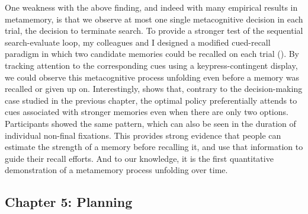 \documentclass[11pt,a4paperpaper,]{article}
\begin{document}
One weakness with the above finding, and indeed with many empirical results in metamemory, is that we observe at most one single metacognitive decision in each trial, the decision to terminate search. To provide a stronger test of the sequential search-evaluate loop, my colleagues and I designed a modified cued-recall paradigm in which two candidate memories could be recalled on each trial (). By tracking attention to the corresponding cues using a keypress-contingent display, we could observe this metacognitive process unfolding even before a memory was recalled or given up on. Interestingly,  shows that, contrary to the decision-making case studied in the previous chapter, the optimal policy preferentially attends to cues associated with stronger memories even when there are only two options. Participants showed the same pattern, which can also be seen in the duration of individual non-final fixations. This provides strong evidence that people can estimate the strength of a memory before recalling it, and use that information to guide their recall efforts. And to our knowledge, it is the first quantitative demonstration of a metamemory process unfolding over time.


\subsection{Chapter 5: Planning}
\end{document}
